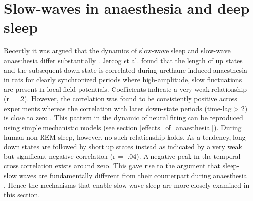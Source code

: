 \section{Slow-waves in anaesthesia and deep sleep}
\label{slow_waves_anaesthesia_sleep}
Recently it was argued that the dynamics of slow-wave sleep and slow-wave anaesthesia differ substantially \parencite{nghiem2018two}. Jercog et al. \parencite*{jercog2017up} found that the length of up states and the subsequent down state is correlated during urethane induced anaesthesia in rats for clearly synchronized periods where high-amplitude, slow fluctuations are present in local field potentials. Coefficients indicate a very weak relationship (r = .2). However, the correlation was found to be consistently positive across experiments whereas the correlation with later down-state periods (time-lag > 2) is close to zero \parencite{jercog2017up}. This pattern in the dynamic of neural firing can be reproduced using simple mechanistic models (see section \ref{effects_of_anaesthesia }). During human non-REM sleep, however, no such relationship holds. As a tendency, long down states are followed by short up states instead as indicated by a very weak but significant negative correlation (r = -.04). A negative peak in the temporal cross correlation exists around zero\parencite{nghiem2018two}. This gave rise to the argument that sleep-slow waves are fundamentally different from their counterpart during anaesthesia \parencite{nghiem2018two}. Hence the mechanisms that enable slow wave sleep are more closely examined in this section. \\


